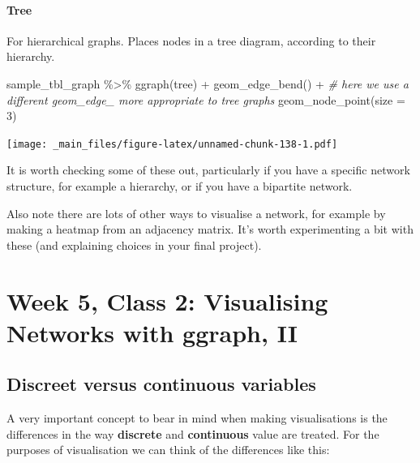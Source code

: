 \documentclass[
]{book}
\newenvironment{Shaded}{\begin{snugshade}}{\end{snugshade}}
\newcommand{\AttributeTok}[1]{\textcolor[rgb]{0.77,0.63,0.00}{#1}}
\newcommand{\CommentTok}[1]{\textcolor[rgb]{0.56,0.35,0.01}{\textit{#1}}}
\newcommand{\DecValTok}[1]{\textcolor[rgb]{0.00,0.00,0.81}{#1}}
\newcommand{\FunctionTok}[1]{\textcolor[rgb]{0.00,0.00,0.00}{#1}}
\newcommand{\NormalTok}[1]{#1}
\newcommand{\SpecialCharTok}[1]{\textcolor[rgb]{0.00,0.00,0.00}{#1}}
\newcommand{\StringTok}[1]{\textcolor[rgb]{0.31,0.60,0.02}{#1}}
\begin{document}
\hypertarget{tree}{%
\subsubsection{Tree}\label{tree}}

For hierarchical graphs. Places nodes in a tree diagram, according to their hierarchy.

\begin{Shaded}
\begin{Highlighting}[]
\NormalTok{sample\_tbl\_graph }\SpecialCharTok{\%\textgreater{}\%} 
  \FunctionTok{ggraph}\NormalTok{(}\StringTok{\textquotesingle{}tree\textquotesingle{}}\NormalTok{) }\SpecialCharTok{+} 
  \FunctionTok{geom\_edge\_bend}\NormalTok{() }\SpecialCharTok{+} \CommentTok{\# here we use a different geom\_edge\_ more appropriate to tree graphs}
  \FunctionTok{geom\_node\_point}\NormalTok{(}\AttributeTok{size =} \DecValTok{3}\NormalTok{)}
\end{Highlighting}
\end{Shaded}

\texttt{[image: \_main\_files/figure-latex/unnamed-chunk-138-1.pdf]}

It is worth checking some of these out, particularly if you have a specific network structure, for example a hierarchy, or if you have a bipartite network.

Also note there are lots of other ways to visualise a network, for example by making a heatmap from an adjacency matrix. It's worth experimenting a bit with these (and explaining choices in your final project).

\hypertarget{week-5-class-2-visualising-networks-with-ggraph-ii}{%
\chapter{Week 5, Class 2: Visualising Networks with ggraph, II}\label{week-5-class-2-visualising-networks-with-ggraph-ii}}

\hypertarget{discreet-versus-continuous-variables}{%
\section{Discreet versus continuous variables}\label{discreet-versus-continuous-variables}}

A very important concept to bear in mind when making visualisations is the differences in the way \textbf{discrete} and \textbf{continuous} value are treated. For the purposes of visualisation we can think of the differences like this:
\end{document}
